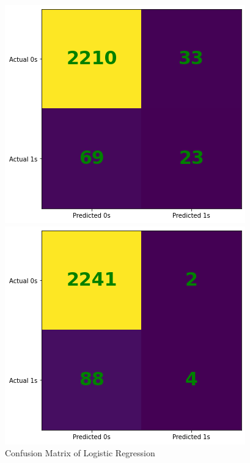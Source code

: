 \documentclass[11pt]{report}
\begin{document}
\begin{figure}[h]
     \centering
     \begin{minipage}{0.32\textwidth}
     \centering
     \includegraphics[width = \linewidth]{lr_cm.png}
     \caption{Confusion Matrix of Logistic Regression}\label{fig:lr_cm}
     \end{minipage}
     \centering
     \begin{minipage}{0.32\textwidth}
     \centering
     \includegraphics[width = \linewidth]{rf_cm.png}

\end{minipage}
\end{figure}
\end{document}
